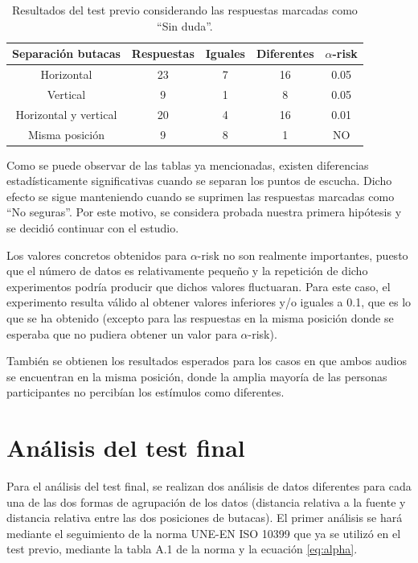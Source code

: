 \documentclass[11pt,a4paper,twoside]{book}
\begin{document}
		\begin{table}[H]
			\begin{center}
			\begin{scriptsize}
			\begin{tabular}{| c | c | c | c || c |}
			    \hline
				\textbf{Separación butacas}&\textbf{Respuestas}&\textbf{Iguales}&\textbf{Diferentes}&\textbf{$\alpha$-risk}\\ \hline
                Horizontal&23&7&16&0.05\\ \hline
                Vertical&9&1&8&0.05\\ \hline
                Horizontal y vertical&20&4&16&0.01\\ \hline
                Misma posición&9&8&1&NO\\ \hline
			\end{tabular}
			\caption{Resultados del test previo considerando las respuestas marcadas como ``Sin duda''.}
			\label{tablaResultadosSinDuda}
			\end{scriptsize}
			\end{center}	
		\end{table}
		
		Como se puede observar de las tablas ya mencionadas, existen diferencias estadísticamente significativas cuando se separan los puntos de escucha. Dicho efecto se sigue manteniendo cuando se suprimen las respuestas marcadas como ``No seguras''. Por este motivo, se considera probada nuestra primera hipótesis y se decidió continuar con el estudio.
		
		Los valores concretos obtenidos para $\alpha$-risk no son realmente importantes, puesto que el número de datos es relativamente pequeño y la repetición de dicho experimentos podría producir que dichos valores fluctuaran. Para este caso, el experimento resulta válido al obtener valores inferiores y/o iguales a 0.1, que es lo que se ha obtenido (excepto para las respuestas en la misma posición donde se esperaba que no pudiera obtener un valor para $\alpha$-risk).
		
		También se obtienen los resultados esperados para los casos en que ambos audios se encuentran en la misma posición, donde la amplia mayoría de las personas participantes no percibían los estímulos como diferentes.
		
    \section{Análisis del test final}
        Para el análisis del test final, se realizan dos análisis de datos diferentes para cada una de las dos formas de agrupación de los datos (distancia relativa a la fuente y distancia relativa entre las dos posiciones de butacas). El primer análisis se hará mediante el seguimiento de la norma UNE-EN ISO 10399 que ya se utilizó en el test previo, mediante la tabla A.1 de la norma y la ecuación \ref{eq:alpha}.
        
\end{document}
